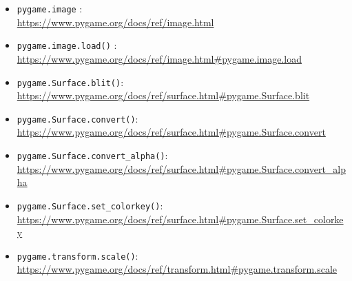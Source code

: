 \begin{itemize}
	\item \texttt{pygame.image}
	:\\
	\url{https://www.pygame.org/docs/ref/image.html}
	
	\item \texttt{pygame.image.load()}
	:\\
	\url{https://www.pygame.org/docs/ref/image.html#pygame.image.load}
	
	\item \texttt{pygame.Surface.blit()}:
	\\
	\url{https://www.pygame.org/docs/ref/surface.html#pygame.Surface.blit}
	
	\item \texttt{pygame.Surface.convert()}:
	\\
	\url{https://www.pygame.org/docs/ref/surface.html#pygame.Surface.convert}
	
	\item \texttt{pygame.Surface.convert\_alpha()}:
	\\
	\url{https://www.pygame.org/docs/ref/surface.html#pygame.Surface.convert\_alpha}
	
	\item \texttt{pygame.Surface.set\_colorkey()}:
	\\
	\url{https://www.pygame.org/docs/ref/surface.html#pygame.Surface.set\_colorkey}
	
	\item \texttt{pygame.transform.scale()}:
	\\
	\url{https://www.pygame.org/docs/ref/transform.html#pygame.transform.scale}
	
\end{itemize}

